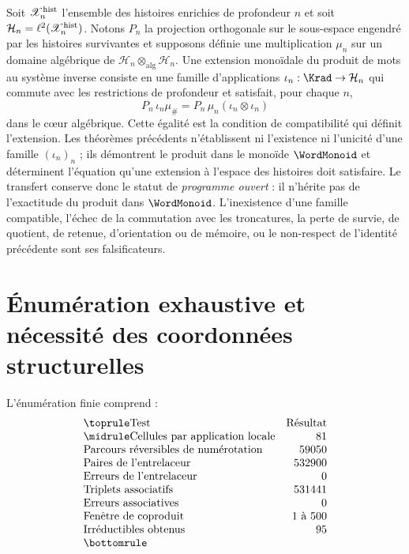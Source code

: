 Soit \(\mathscr X_n^{\rm hist}\) l'ensemble des histoires enrichies de
profondeur \(n\) et soit
\(\mathcal H_n=\ell^2(\mathscr X_n^{\rm hist})\). Notons \(P_n\) la
projection orthogonale sur le sous-espace engendré par les histoires
survivantes et supposons définie une multiplication \(\mu_n\) sur un
domaine algébrique de
\(\mathcal H_n\otimes_{\mathrm{alg}}\mathcal H_n\). Une extension monoïdale
du produit de mots au système inverse consiste en une famille
d'applications \(\iota_n:\Krad\to\mathcal H_n\) qui commute avec les
restrictions de profondeur et satisfait, pour chaque \(n\),
\[
 P_n\,\iota_n\mu_\#
 =P_n\,\mu_n
 (\iota_n\otimes\iota_n)
\]
dans le cœur algébrique. Cette égalité est la condition de compatibilité qui
définit l'extension. Les théorèmes précédents n'établissent ni l'existence ni
l'unicité d'une famille \((\iota_n)_n\) ; ils démontrent le produit dans le
monoïde \(\WordMonoid\) et déterminent l'équation qu'une extension à l'espace
des histoires doit satisfaire. Le transfert conserve donc le
statut de \emph{programme ouvert} : il n'hérite pas de l'exactitude du produit dans
\(\WordMonoid\). L'inexistence d'une famille compatible, l'échec de la
commutation avec les troncatures, la perte de survie, de quotient,
de retenue, d'orientation ou de mémoire, ou le non-respect de l'identité précédente
sont ses falsificateurs.
\fi

\section{Énumération exhaustive et nécessité des coordonnées structurelles}

L'énumération finie comprend :
\[
\begin{array}{@{}lr@{}}
\toprule
\text{Test}&\text{Résultat}\\\midrule
\text{Cellules par application locale}&81\\
\text{Parcours réversibles de numérotation}&59050\\
\text{Paires de l’entrelaceur}&532900\\
\text{Erreurs de l’entrelaceur}&0\\
\text{Triplets associatifs}&531441\\
\text{Erreurs associatives}&0\\
\text{Fenêtre de coproduit}&1\text{ à }500\\
\text{Irréductibles obtenus}&95\\
\bottomrule
\end{array}
\]

